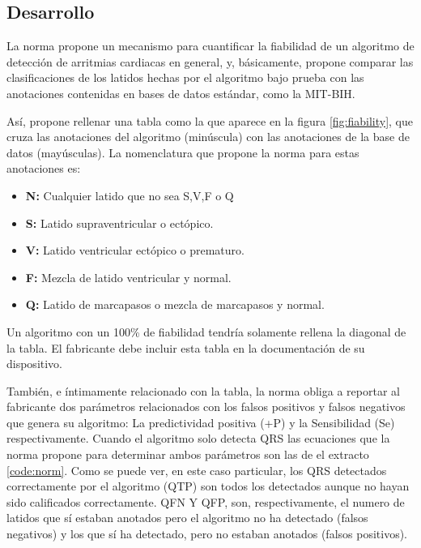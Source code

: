     \subsection{Desarrollo}
    
 
    La norma propone un mecanismo para cuantificar la fiabilidad de un algoritmo de detección de arritmias cardiacas en general, y, básicamente, propone comparar las clasificaciones de los latidos hechas por el algoritmo bajo prueba con las anotaciones contenidas en bases de datos estándar, como la MIT-BIH. 
    
    Así, propone rellenar una tabla como la que aparece en la figura \ref{fig:fiability}, que cruza las anotaciones del algoritmo (minúscula) con las anotaciones de la base de datos (mayúsculas). La nomenclatura que propone la norma para estas anotaciones es: 
    \begin{itemize}
        \item \textbf{N:} Cualquier latido que no sea S,V,F o Q
        \item \textbf{S:} Latido supraventricular o ectópico.
        \item \textbf{V:} Latido ventricular ectópico o prematuro.
        \item \textbf{F:} Mezcla de latido ventricular y normal.
        \item \textbf{Q:} Latido de marcapasos o mezcla de marcapasos y normal.
    \end{itemize}
     
    Un algoritmo con un 100\% de fiabilidad tendría solamente rellena la diagonal de la tabla. El fabricante debe incluir esta tabla en la documentación de su dispositivo.
    
    También, e íntimamente relacionado con la tabla, la norma obliga  a reportar al fabricante dos parámetros relacionados con los falsos positivos y falsos negativos que genera su algoritmo: La predictividad positiva (+P) y la Sensibilidad (Se) respectivamente. Cuando el algoritmo solo detecta QRS las ecuaciones que la norma propone para determinar ambos parámetros son las de el extracto \ref{code:norm}. Como se puede ver, en este caso particular, los QRS detectados correctamente por el algoritmo (QTP) son todos los detectados aunque no hayan sido calificados correctamente. QFN Y QFP, son, respectivamente, el numero de latidos que sí estaban anotados pero el algoritmo no ha detectado (falsos negativos) y los que sí ha detectado, pero no estaban anotados (falsos positivos).
     
